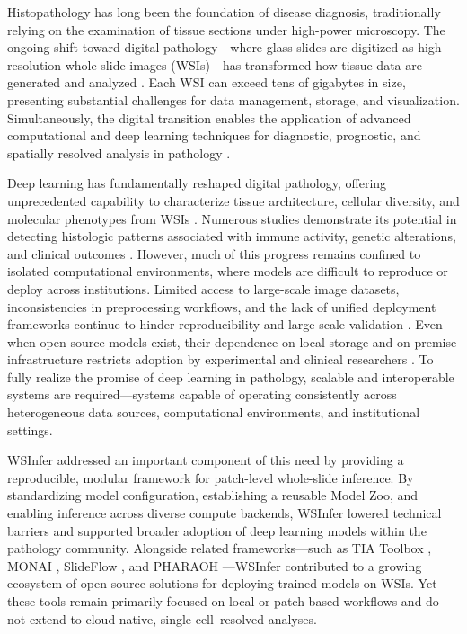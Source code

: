 \documentclass[sn-mathphys-num]{sn-jnl}%
\theoremstyle{thmstyleone}%
\theoremstyle{thmstyletwo}%
\theoremstyle{thmstylethree}%
\begin{document}
	Histopathology has long been the foundation of disease diagnosis, traditionally relying on the examination of tissue sections under high-power microscopy. The ongoing shift toward digital pathology—where glass slides are digitized as high-resolution whole-slide images (WSIs)—has transformed how tissue data are generated and analyzed \cite{Gupta:2019}. Each WSI can exceed tens of gigabytes in size, presenting substantial challenges for data management, storage, and visualization. Simultaneously, the digital transition enables the application of advanced computational and deep learning techniques for diagnostic, prognostic, and spatially resolved analysis in pathology \cite{Echle:2020}.
	
	Deep learning has fundamentally reshaped digital pathology, offering unprecedented capability to characterize tissue architecture, cellular diversity, and molecular phenotypes from WSIs \cite{Laak:2021}. Numerous studies demonstrate its potential in detecting histologic patterns associated with immune activity, genetic alterations, and clinical outcomes \cite{Gupta:2019}. However, much of this progress remains confined to isolated computational environments, where models are difficult to reproduce or deploy across institutions. Limited access to large-scale image datasets, inconsistencies in preprocessing workflows, and the lack of unified deployment frameworks continue to hinder reproducibility and large-scale validation \cite{Kaczmarzyk:2024}. Even when open-source models exist, their dependence on local storage and on-premise infrastructure restricts adoption by experimental and clinical researchers \cite{Luik:2024}. To fully realize the promise of deep learning in pathology, scalable and interoperable systems are required—systems capable of operating consistently across heterogeneous data sources, computational environments, and institutional settings.
	
	WSInfer \cite{Kaczmarzyk:2024} addressed an important component of this need by providing a reproducible, modular framework for patch-level whole-slide inference. By standardizing model configuration, establishing a reusable Model Zoo, and enabling inference across diverse compute backends, WSInfer lowered technical barriers and supported broader adoption of deep learning models within the pathology community. Alongside related frameworks—such as TIA Toolbox \cite{Pocock:2022}, MONAI \cite{Cardoso:2022}, SlideFlow \cite{Dolezal:2024}, and PHARAOH \cite{Faust:2024}—WSInfer contributed to a growing ecosystem of open-source solutions for deploying trained models on WSIs. Yet these tools remain primarily focused on local or patch-based workflows and do not extend to cloud-native, single-cell–resolved analyses.
	
\end{document}
